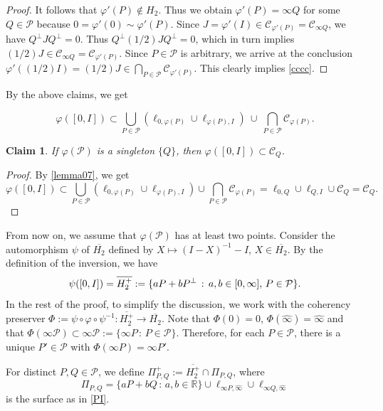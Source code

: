 \documentclass[10pt]{amsart}
\newtheorem{claim}[theorem]{Claim}
\theoremstyle{definition}
\theoremstyle{remark}
\numberwithin{subsection}{section}
\numberwithin{equation}{section}
\newcommand\cC{{\mathcal{C}}}
\newcommand\cP{{\mathcal{P}}}
\newcommand\bR{{\mathbb{R}}}
\newcommand\oH{{\overline{H_2}}}
\newcommand\oHp{{\overline{H_2^+}}}
\newcommand\oi{{\widehat{\infty}}}
\newcommand\pp{{\Pi_{P,Q}^+}}
\begin{document}
\begin{proof}
It follows that $\varphi'(P)\notin H_2$. 
Thus we obtain $\varphi'(P)=\infty Q$ for some $Q\in \mathcal{P}$ because $0=\varphi'(0)\sim \varphi'(P)$. 
Since $J=\varphi'(I)\in \cC_{\varphi'(P)}=\cC_{\infty Q}$, we have $Q^\perp JQ^\perp=0$. Thus $Q^\perp (1/2)JQ^\perp=0$, which in turn implies $(1/2)J\in \cC_{\infty Q}=\cC_{\varphi'(P)}$. 
Since $P\in \cP$ is arbitrary, we arrive at the conclusion $\varphi'((1/2)I) =(1/2)J\in \bigcap_{P\in \cP} \cC_{\varphi'(P)}$. 
This clearly implies \eqref{cccc}.
\end{proof}

By the above claims, we get 

\begin{equation}\label{lemma07}
\varphi ([0,I]) \subset \bigcup_{P \in \mathcal{P}} \left( \ell_{0, \varphi (P)} \cup \ell_{\varphi (P), I}  \right) \ \cup \ \bigcap_{P \in \mathcal{P}} \mathcal{C}_{\varphi (P)}.
\end{equation}



\begin{claim}
If $\varphi(\cP)$ is a singleton $\{Q\}$, then $\varphi([0, I])\subset \mathcal{C}_{Q}$. 
\end{claim}
\begin{proof}
By \eqref{lemma07}, we get
\[
\varphi([0, I])\subset \bigcup_{P\in \cP}(\ell_{0, \varphi(P)}\cup \ell_{\varphi(P), I}) \cup \bigcap_{P\in \cP} \cC_{\varphi(P)}
= \ell_{0, Q}\cup \ell_{Q, I} \cup \cC_Q
= \cC_Q.
\]
\end{proof}

From now on, we assume that $\varphi(\cP)$ has at least two points.
Consider the automorphism $\psi$ of $\oH$ defined by $X\mapsto (I-X)^{-1} -I$, $X\in \oH$. 
By the definition of the inversion, we have 
\[
\psi([0, I])=\oHp:=\{aP+bP^\perp\,:\, a, b\in [0,\infty],\,P\in \cP\}. \index{$Hp$@$\oHp$}
\]
In the rest of the proof, to simplify the discussion, we work with the coherency preserver $\Phi:=\psi\circ\varphi\circ \psi^{-1}\colon \oHp\to \oH$. 
Note that $\Phi(0)=0$, $\Phi({\oi})={\oi}$ and that $\Phi(\infty\cP)\subset \infty\cP:=\{\infty P\,:\, P\in \cP\}$\index{$Pinfty2$@$\infty\cP$}.
Therefore, for each $P\in \cP$, there is a unique $P'\in \cP$ with $\Phi(\infty P)=\infty P'$. 


For distinct $P, Q\in \cP$,
we define $\pp:= \oHp\cap \Pi_{P,Q}$\index{$PiPQ2$@$\pp$}, where 
\[
\Pi_{P,Q} = \{aP+bQ\,:\, a, b\in \bR\}\cup \ell_{\infty P, \oi}\cup \ell_{\infty Q, \oi}
\] 
is the surface as in \eqref{PI}.
\end{document}
